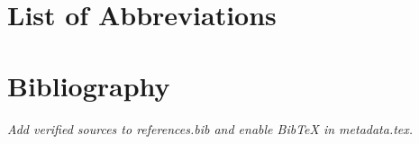 \documentclass[a4paper,12pt,oneside,openany]{book}
\begin{document}
\hypersetup{pageanchor=false}
\frontmatter

\hypersetup{pageanchor=true}

\tableofcontents
\chapter*{List of Abbreviations}
{}
\printacronyms

\mainmatter
% 








\backmatter
{}
{}
\ifthesisbibliography
  
  
\else
  \chapter*{Bibliography}
  \noindent\emph{Add verified sources to references.bib and enable BibTeX in metadata.tex.}
\fi
\end{document}
